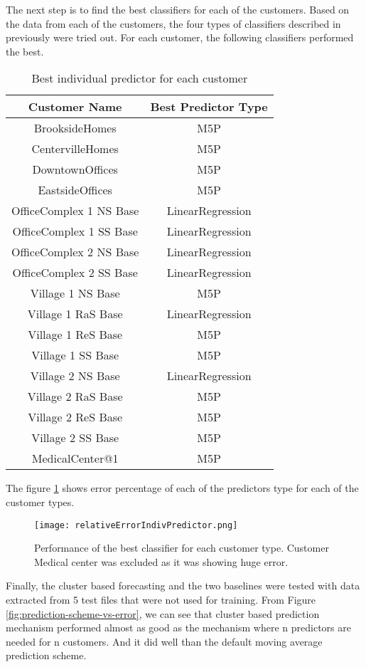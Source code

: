 The next step is to find the best classifiers for each of the customers. Based on the data from each of the customers, the four types of classifiers described in previously were tried out. For each customer, the following classifiers performed the best. 

\begin{table}[h!]
\centering
\caption{Best individual predictor for each customer}
\begin{tabular}{|c| c|} 
 \hline
 Customer Name & Best Predictor Type \\ [0.5ex] 
 \hline
BrooksideHomes &	M5P \\
CentervilleHomes &	M5P \\
DowntownOffices &	M5P \\
EastsideOffices &	M5P \\
OfficeComplex 1 NS Base &	LinearRegression \\
OfficeComplex 1 SS Base &	LinearRegression \\
OfficeComplex 2 NS Base &	LinearRegression \\
OfficeComplex 2 SS Base &	LinearRegression \\
Village 1 NS Base &	M5P \\
Village 1 RaS Base &	LinearRegression \\
Village 1 ReS Base &	M5P \\
Village 1 SS Base &	M5P \\
Village 2 NS Base &	LinearRegression \\
Village 2 RaS Base &	M5P \\
Village 2 ReS Base &	M5P \\
Village 2 SS Base &	M5P \\
MedicalCenter@1	& M5P \\ [1ex] 
 \hline
\end{tabular}
\label{table:1}
\end{table}

The figure \ref{fig:indiv-cutomer-best-predictor-error} shows error percentage of each of the predictors type for each of the customer types.

\begin{figure}[h!]
  \texttt{[image: relativeErrorIndivPredictor.png]}
  \caption{Performance of the best classifier for each customer type. Customer Medical center was excluded as it was showing huge error. }
  \label{fig:indiv-cutomer-best-predictor-error}
\end{figure}

Finally, the cluster based forecasting and the two baselines were tested with data extracted from 5 test files that were not used for training. From Figure \ref{fig:prediction-scheme-vs-error}, we can see that cluster based prediction mechanism performed almost as good as the mechanism where n predictors are needed for n customers. And it did well than the default moving average prediction scheme.



